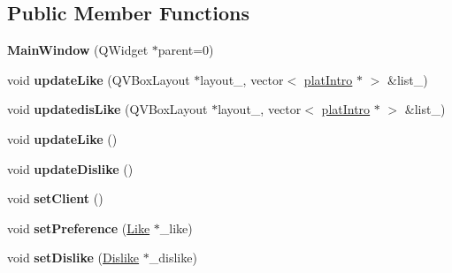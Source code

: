 \subsection*{Public Member Functions}
\begin{DoxyCompactItemize}
\item 
{\bfseries Main\+Window} (Q\+Widget $\ast$parent=0)\hypertarget{class_main_window_a8b244be8b7b7db1b08de2a2acb9409db}{}\label{class_main_window_a8b244be8b7b7db1b08de2a2acb9409db}

\item 
void {\bfseries update\+Like} (Q\+V\+Box\+Layout $\ast$layout\+\_\+, vector$<$ \hyperlink{classplat_intro}{plat\+Intro} $\ast$ $>$ \&list\+\_\+)\hypertarget{class_main_window_a9ad74def483045acb64534c0f397adbc}{}\label{class_main_window_a9ad74def483045acb64534c0f397adbc}

\item 
void {\bfseries updatedis\+Like} (Q\+V\+Box\+Layout $\ast$layout\+\_\+, vector$<$ \hyperlink{classplat_intro}{plat\+Intro} $\ast$ $>$ \&list\+\_\+)\hypertarget{class_main_window_ae7f2b02aaad962833cd4a5870d50bf07}{}\label{class_main_window_ae7f2b02aaad962833cd4a5870d50bf07}

\item 
void {\bfseries update\+Like} ()\hypertarget{class_main_window_abc427e82a2f09332245c8881cb41625c}{}\label{class_main_window_abc427e82a2f09332245c8881cb41625c}

\item 
void {\bfseries update\+Dislike} ()\hypertarget{class_main_window_a5e2496f25f7b70d6af56fb40ac08487b}{}\label{class_main_window_a5e2496f25f7b70d6af56fb40ac08487b}

\item 
void {\bfseries set\+Client} ()\hypertarget{class_main_window_a62c5fc1c8d38d29783d817704ae529ae}{}\label{class_main_window_a62c5fc1c8d38d29783d817704ae529ae}

\item 
void {\bfseries set\+Preference} (\hyperlink{class_like}{Like} $\ast$\+\_\+like)\hypertarget{class_main_window_af96e41539c9bfd54a30b14ee4cfa7b1e}{}\label{class_main_window_af96e41539c9bfd54a30b14ee4cfa7b1e}

\item 
void {\bfseries set\+Dislike} (\hyperlink{class_dislike}{Dislike} $\ast$\+\_\+dislike)\hypertarget{class_main_window_a5d03cd61b08a4c7954391cb42f2a301c}{}\label{class_main_window_a5d03cd61b08a4c7954391cb42f2a301c}

\end{DoxyCompactItemize}

